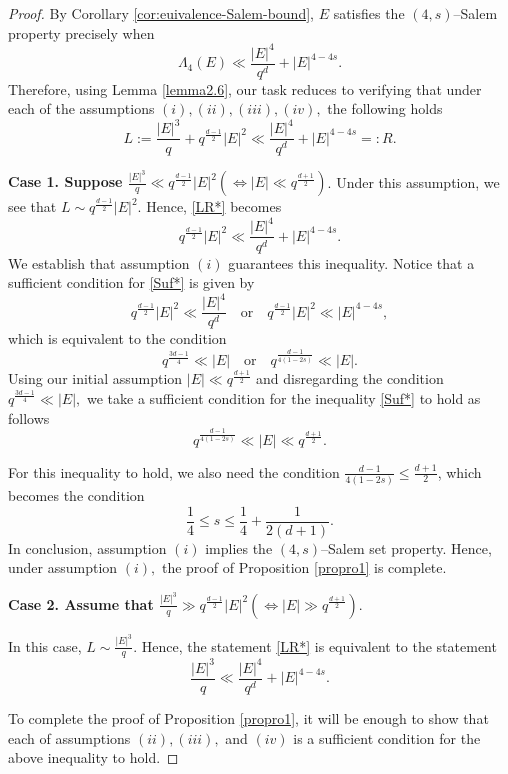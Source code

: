 \documentclass[11pt]{article}
\begin{document}
\begin{proof}

By Corollary \ref{cor:euivalence-Salem-bound}, $E$ satisfies the $(4, s)$--Salem property precisely when
\[ \Lambda_4(E) \ll \frac{|E|^4}{q^d}+ |E|^{4-4s} .\]
Therefore, using Lemma  \eqref{lemma2.6}, our task reduces to verifying that under each of the assumptions $(i), (ii), (iii), (iv),$ the following holds
\begin{equation} \label{LR*} L:= \frac{|E|^3}{q} + q^{\frac{d-1}{2}}|E|^2 \ll \frac{|E|^4}{q^d}+ |E|^{4-4s}=: R. \end{equation}

\medskip
\noindent
\textbf{Case 1. Suppose $\frac{|E|^3}{q} \ll q^{\frac{d-1}{2}}|E|^2 (\iff |E| \ll q^{\frac{d+1}{2}})$}.
Under this assumption,  we see that $L\sim q^{\frac{d-1}{2}}|E|^2$. Hence,  \eqref{LR*} becomes
\begin{equation}\label{Suf*} q^{\frac{d-1}{2}}|E|^2 \ll \frac{|E|^4}{q^d}+ |E|^{4-4s}.\end{equation}
We establish that assumption $(i)$ guarantees this inequality.
Notice that  a sufficient condition for  \eqref{Suf*} is given by 
\[ q^{\frac{d-1}{2}}|E|^2 \ll \frac{|E|^4}{q^d}  \quad \mbox{or} \quad  q^{\frac{d-1}{2}}|E|^2 \ll  |E|^{4-4s},\]
which is  equivalent to the condition
$$  q^{\frac{3d-1}{4}} \ll |E|  \quad \mbox{or}\quad q^{\frac{d-1}{4(1-2s)} }\ll |E|.$$
Using  our initial assumption $|E|\ll q^{\frac{d+1}{2}}$ and disregarding the condition $q^{\frac{3d-1}{4}} \ll |E|, $  we take a sufficient condition for the inequality \eqref{Suf*} to hold as follows
\[q^{\frac{d-1}{4(1-2s)} }\ll |E| \ll q^{\frac{d+1}{2}}.\]

For this inequality to hold,  we  also need the condition 
$\frac{d-1}{4(1-2s)} \le \frac{d+1}{2}$, which becomes the condition 
$$\frac{1}{4} \leq s \le \frac{1}{4}+\frac{1}{2(d+1)}.$$
In conclusion,   assumption $(i)$ implies  the $(4,s)$--Salem set property.  Hence, under assumption $(i),$ the proof of Proposition \ref{propro1} is complete.

\textbf{Case 2. Assume that $\frac{|E|^3}{q} \gg q^{\frac{d-1}{2}}|E|^2 (\iff |E| \gg q^{\frac{d+1}{2}})$}.

In this case,   $L\sim \frac{|E|^3}{q}$.   Hence,  the statement \eqref{LR*}  is equivalent to the statement
\begin{equation}\label{ECT*} \frac{|E|^3}{q}  \ll  \frac{|E|^4}{q^d}+ |E|^{4-4s}.\end{equation}

To complete the proof of Proposition \ref{propro1},  it will be enough to show that   each of assumptions $(ii), (iii),$ and $(iv)$ is a sufficient condition for the above inequality to hold.


\end{proof}
\end{document}
